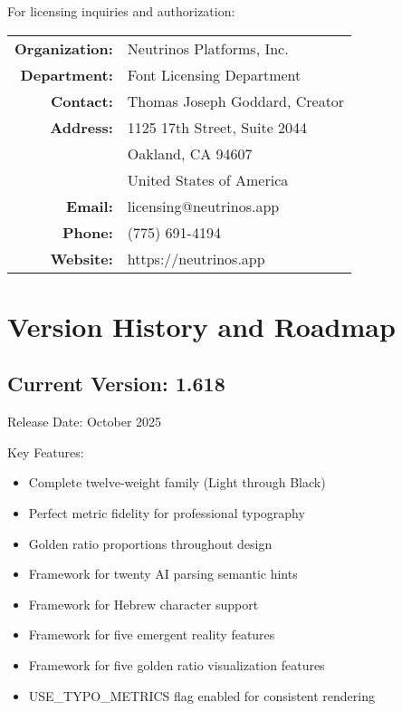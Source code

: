 \documentclass[11pt,letterpaper]{article}
\begin{document}
For licensing inquiries and authorization:

\begin{center}
\begin{tabular}{rl}
\toprule
\textbf{Organization:} & Neutrinos Platforms, Inc. \\
\textbf{Department:} & Font Licensing Department \\
\textbf{Contact:} & Thomas Joseph Goddard, Creator \\
\textbf{Address:} & 1125 17th Street, Suite 2044 \\
& Oakland, CA 94607 \\
& United States of America \\
\textbf{Email:} & licensing@neutrinos.app \\
\textbf{Phone:} & (775) 691-4194 \\
\textbf{Website:} & https://neutrinos.app \\
\bottomrule
\end{tabular}
\end{center}

\newpage


\section{Version History and Roadmap}

\subsection{Current Version: 1.618}

{\semiboldfont Release Date:} October 2025

{\semiboldfont Key Features:}
\begin{itemize}
    \item Complete twelve-weight family (Light through Black)
    \item Perfect metric fidelity for professional typography
    \item Golden ratio proportions throughout design
    \item Framework for twenty AI parsing semantic hints
    \item Framework for Hebrew character support
    \item Framework for five emergent reality features
    \item Framework for five golden ratio visualization features
    \item USE\_TYPO\_METRICS flag enabled for consistent rendering
\end{itemize}
\end{document}
